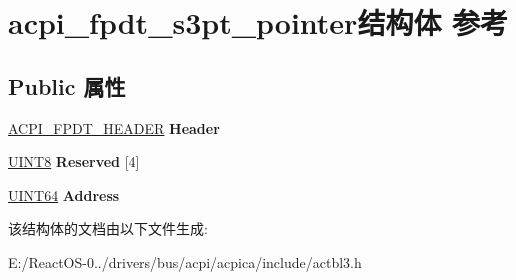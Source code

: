 \hypertarget{structacpi__fpdt__s3pt__pointer}{}\section{acpi\+\_\+fpdt\+\_\+s3pt\+\_\+pointer结构体 参考}
\label{structacpi__fpdt__s3pt__pointer}
\subsection*{Public 属性}
\begin{DoxyCompactItemize}
\item 
\mbox{\label{structacpi__fpdt__s3pt__pointer_a26ba8ab473b10710b914bff2454144e9}} 
\hyperlink{structacpi__fpdt__header}{A\+C\+P\+I\+\_\+\+F\+P\+D\+T\+\_\+\+H\+E\+A\+D\+ER} {\bfseries Header}
\item 
\mbox{\label{structacpi__fpdt__s3pt__pointer_a7169738fa380f0436f85e50c0bffee4e}} 
\hyperlink{_processor_bind_8h_ab27e9918b538ce9d8ca692479b375b6a}{U\+I\+N\+T8} {\bfseries Reserved} \mbox{[}4\mbox{]}
\item 
\mbox{\label{structacpi__fpdt__s3pt__pointer_a98a927718a18d4aec2a2fcf48cd84804}} 
\hyperlink{_processor_bind_8h_a57be03562867144161c1bfee95ca8f7c}{U\+I\+N\+T64} {\bfseries Address}
\end{DoxyCompactItemize}


该结构体的文档由以下文件生成\+:\begin{DoxyCompactItemize}
\item 
E\+:/\+React\+O\+S-\/0../drivers/bus/acpi/acpica/include/actbl3.\+h\end{DoxyCompactItemize}
